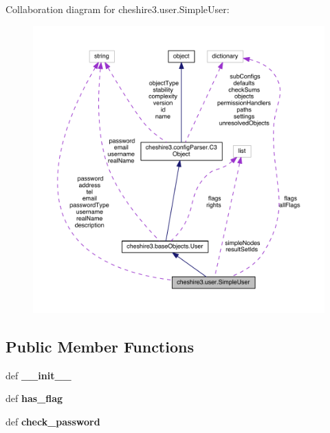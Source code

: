 Collaboration diagram for cheshire3.\-user.\-Simple\-User\-:
\nopagebreak
\begin{figure}[H]
\begin{center}
\leavevmode
\includegraphics[width=350pt]{classcheshire3_1_1user_1_1_simple_user__coll__graph}
\end{center}
\end{figure}
\subsection*{Public Member Functions}
\begin{DoxyCompactItemize}
\item 
\hypertarget{classcheshire3_1_1user_1_1_simple_user_a7808b3f2ff414b4c14d805719cbd8d11}{def {\bfseries \-\_\-\-\_\-init\-\_\-\-\_\-}}\label{classcheshire3_1_1user_1_1_simple_user_a7808b3f2ff414b4c14d805719cbd8d11}

\item 
\hypertarget{classcheshire3_1_1user_1_1_simple_user_a312c393c0f63065edf5b73915853d6bd}{def {\bfseries has\-\_\-flag}}\label{classcheshire3_1_1user_1_1_simple_user_a312c393c0f63065edf5b73915853d6bd}

\item 
\hypertarget{classcheshire3_1_1user_1_1_simple_user_a5398a4b1ca1c14dc0c30e754ce6ccd78}{def {\bfseries check\-\_\-password}}\label{classcheshire3_1_1user_1_1_simple_user_a5398a4b1ca1c14dc0c30e754ce6ccd78}

\end{DoxyCompactItemize}
